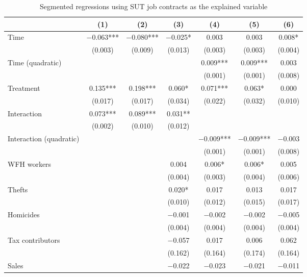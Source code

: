 \documentclass[11pt,a4paper]{article}\usepackage[]{graphicx}\usepackage[]{xcolor}
\begin{document}
\begin{table}[h]
\caption{Segmented regressions using SUT job contracts as the explained variable}

\begin{tabular}[t]{lcccccc}
\toprule
  & (1) & (2) & (3) & (4) & (5) & (6)\\
\midrule
Time & \num{-0.063}*** & \num{-0.080}*** & \num{-0.025}* & \num{0.003} & \num{0.003} & \num{0.008}*\\
 & (\num{0.003}) & (\num{0.009}) & (\num{0.013}) & (\num{0.003}) & (\num{0.003}) & (\num{0.004})\\
Time (quadratic) &  &  &  & \num{0.009}*** & \num{0.009}*** & \num{0.003}\\
 &  &  &  & (\num{0.001}) & (\num{0.001}) & \vphantom{1} (\num{0.008})\\
Treatment & \num{0.135}*** & \num{0.198}*** & \num{0.060}* & \num{0.071}*** & \num{0.063}* & \num{0.000}\\
 & (\num{0.017}) & (\num{0.017}) & (\num{0.034}) & (\num{0.022}) & (\num{0.032}) & (\num{0.010})\\
Interaction & \num{0.073}*** & \num{0.089}*** & \num{0.031}** &  &  & \\
 & (\num{0.002}) & (\num{0.010}) & (\num{0.012}) &  &  & \\
Interaction (quadratic) &  &  &  & \num{-0.009}*** & \num{-0.009}*** & \num{-0.003}\\
 &  &  &  & (\num{0.001}) & (\num{0.001}) & (\num{0.008})\\
WFH workers &  &  & \num{0.004} & \num{0.006}* & \num{0.006}* & \num{0.005}\\
 &  &  & (\num{0.004}) & (\num{0.003}) & (\num{0.004}) & (\num{0.006})\\
Thefts &  &  & \num{0.020}* & \num{0.017} & \num{0.013} & \num{0.017}\\
 &  &  & (\num{0.010}) & (\num{0.012}) & (\num{0.015}) & (\num{0.017})\\
Homicides &  &  & \num{-0.001} & \num{-0.002} & \num{-0.002} & \num{-0.005}\\
 &  &  & (\num{0.004}) & (\num{0.004}) & (\num{0.004}) & (\num{0.004})\\
Tax contributors &  &  & \num{-0.057} & \num{0.017} & \num{0.006} & \num{0.062}\\
 &  &  & (\num{0.162}) & (\num{0.164}) & (\num{0.174}) & (\num{0.164})\\
Sales &  &  & \num{-0.022} & \num{-0.023} & \num{-0.021} & \num{-0.011}\\

\end{tabular}
\end{table}
\end{document}
